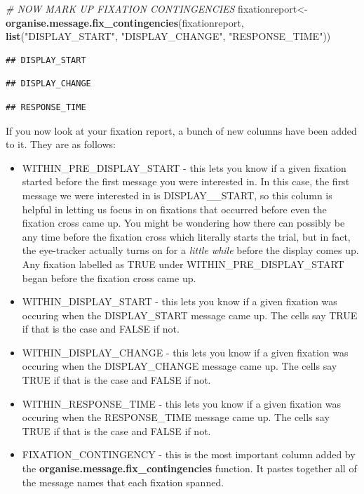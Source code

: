 \documentclass[]{book}
\newenvironment{Shaded}{\begin{snugshade}}{\end{snugshade}}
\newcommand{\CommentTok}[1]{\textcolor[rgb]{0.56,0.35,0.01}{\textit{#1}}}
\newcommand{\KeywordTok}[1]{\textcolor[rgb]{0.13,0.29,0.53}{\textbf{#1}}}
\newcommand{\NormalTok}[1]{#1}
\newcommand{\StringTok}[1]{\textcolor[rgb]{0.31,0.60,0.02}{#1}}
\begin{document}
\begin{Shaded}
\begin{Highlighting}[]
\CommentTok{# NOW MARK UP FIXATION CONTINGENCIES}
\NormalTok{fixationreport<-}\KeywordTok{organise.message.fix_contingencies}\NormalTok{(fixationreport, }
                                              \KeywordTok{list}\NormalTok{(}\StringTok{"DISPLAY_START"}\NormalTok{, }
                                                   \StringTok{"DISPLAY_CHANGE"}\NormalTok{, }
                                                   \StringTok{"RESPONSE_TIME"}\NormalTok{))}
\end{Highlighting}
\end{Shaded}

\begin{verbatim}
## DISPLAY_START
\end{verbatim}

\begin{verbatim}
## DISPLAY_CHANGE
\end{verbatim}

\begin{verbatim}
## RESPONSE_TIME
\end{verbatim}

If you now look at your fixation report, a bunch of new columns have been added to it. They are as follows:

\begin{itemize}
\item
  WITHIN\_PRE\_DISPLAY\_START - this lets you know if a given fixation started before the first message you were interested in. In this case, the first message we were interested in is DISPLAY\_\_START, so this column is helpful in letting us focus in on fixations that occurred before even the fixation cross came up. You might be wondering how there can possibly be any time before the fixation cross which literally starts the trial, but in fact, the eye-tracker actually turns on for a \emph{little while} before the display comes up. Any fixation labelled as TRUE under WITHIN\_PRE\_DISPLAY\_START began before the fixation cross came up.
\item
  WITHIN\_DISPLAY\_START - this lets you know if a given fixation was occuring when the DISPLAY\_START message came up. The cells say TRUE if that is the case and FALSE if not.
\item
  WITHIN\_DISPLAY\_CHANGE - this lets you know if a given fixation was occuring when the DISPLAY\_CHANGE message came up. The cells say TRUE if that is the case and FALSE if not.
\item
  WITHIN\_RESPONSE\_TIME - this lets you know if a given fixation was occuring when the RESPONSE\_TIME message came up. The cells say TRUE if that is the case and FALSE if not.
\item
  FIXATION\_CONTINGENCY - this is the most important column added by the \textbf{organise.message.fix\_contingencies} function. It pastes together all of the message names that each fixation spanned.
\end{itemize}
\end{document}
